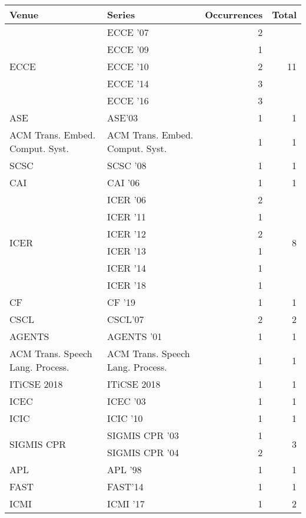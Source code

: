 \begin{table*}[t]
\begin{tabular}{llrr}
Venue & Series & Occurrences & Total\\\hline
\multirow{5}{*}{ECCE } & ECCE '07 & 2 & \multirow{5}{*}{11}\\
& ECCE '09 & 1 &\\
& ECCE '10 & 2 &\\
& ECCE '14 & 3 &\\
& ECCE '16 & 3 &\\
\multirow{1}{*}{ASE} & ASE'03 & 1 & \multirow{1}{*}{1}\\
\multirow{1}{*}{ACM Trans. Embed. Comput. Syst.} & ACM Trans. Embed. Comput. Syst. & 1 & \multirow{1}{*}{1}\\
\multirow{1}{*}{SCSC } & SCSC '08 & 1 & \multirow{1}{*}{1}\\
\multirow{1}{*}{CAI } & CAI '06 & 1 & \multirow{1}{*}{1}\\
\multirow{6}{*}{ICER } & ICER '06 & 2 & \multirow{6}{*}{8}\\
& ICER '11 & 1 &\\
& ICER '12 & 2 &\\
& ICER '13 & 1 &\\
& ICER '14 & 1 &\\
& ICER '18 & 1 &\\
\multirow{1}{*}{CF } & CF '19 & 1 & \multirow{1}{*}{1}\\
\multirow{1}{*}{CSCL} & CSCL'07 & 2 & \multirow{1}{*}{2}\\
\multirow{1}{*}{AGENTS } & AGENTS '01 & 1 & \multirow{1}{*}{1}\\
\multirow{1}{*}{ACM Trans. Speech Lang. Process.} & ACM Trans. Speech Lang. Process. & 1 & \multirow{1}{*}{1}\\
\multirow{1}{*}{ITiCSE 2018} & ITiCSE 2018 & 1 & \multirow{1}{*}{1}\\
\multirow{1}{*}{ICEC } & ICEC '03 & 1 & \multirow{1}{*}{1}\\
\multirow{1}{*}{ICIC } & ICIC '10 & 1 & \multirow{1}{*}{1}\\
\multirow{2}{*}{SIGMIS CPR } & SIGMIS CPR '03 & 1 & \multirow{2}{*}{3}\\
& SIGMIS CPR '04 & 2 &\\
\multirow{1}{*}{APL } & APL '98 & 1 & \multirow{1}{*}{1}\\
\multirow{1}{*}{FAST} & FAST'14 & 1 & \multirow{1}{*}{1}\\
\multirow{2}{*}{ICMI } & ICMI '17 & 1 & \multirow{2}{*}{2}\\

\end{tabular}
\end{table*}
